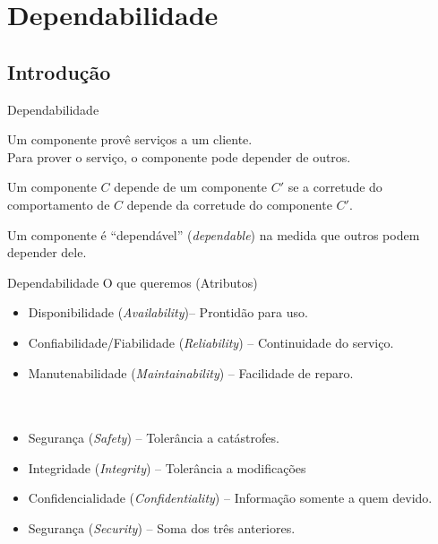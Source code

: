 \section{Dependabilidade}
\subsection{Introdução}


\begin{frame}{Dependabilidade}
\begin{block}{}
	Um componente provê serviços a um cliente.\\ 
	Para prover o serviço, o componente pode \alert{depender} de outros.
\end{block}

\begin{block}{}
	Um componente $C$ depende de um componente $C'$ se a corretude do comportamento de $C$ depende da corretude do componente $C'$.
\end{block}

\begin{block}{}
Um componente é ``dependável'' (\emph{dependable}) na medida que outros podem depender dele.
\end{block}
\end{frame}

\begin{frame}{Dependabilidade}
O que queremos (Atributos)
\begin{itemize}
	\item Disponibilidade (\emph{Availability})-- Prontidão para uso.
	\item Confiabilidade/Fiabilidade (\emph{Reliability}) -- Continuidade do serviço.
	\item Manutenabilidade (\emph{Maintainability}) -- Facilidade de reparo.	\\~ \\~\\
	
	\item Segurança (\emph{Safety}) -- Tolerância a catástrofes.
	\item Integridade (\emph{Integrity}) -- Tolerância a modificações
	\item Confidencialidade (\emph{Confidentiality}) -- Informação somente a quem devido.
	\item Segurança (\emph{Security}) -- Soma dos três anteriores.
\end{itemize}
\end{frame}


